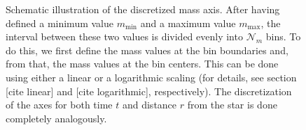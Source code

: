\begin{figure}[h!]
\begin{center}
    \end{center}
    \caption{Schematic illustration of the discretized mass axis. After having defined a minimum 
        value $m_\text{min}$ and a maximum value $m_\text{max}$, the interval between these two 
        values is divided evenly into $\mathcal N_m$ bins. To do this, we first define the mass
        values at the bin boundaries and, from that, the mass values at the bin centers. 
        This can be done using either a linear or a logarithmic scaling (for details, see section
        [cite linear] and [cite logarithmic], respectively). The discretization of the 
        axes for both time $t$ and distance $r$ from the star is done completely analogously.}
    \label{fig:continuous_and_discrete_mass_axis}
\end{figure}
